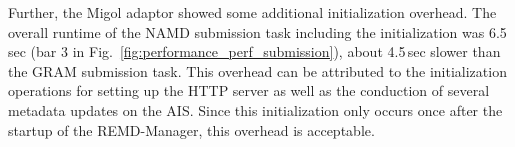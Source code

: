 \documentclass{rspublic}
\begin{document}
Further, the Migol adaptor showed some additional initialization
overhead. The overall runtime of the NAMD submission task including
the initialization was 6.5\,sec (bar 3 in
Fig.~\ref{fig:performance_perf_submission}), about 4.5\,sec slower
than the GRAM submission task. This overhead can be attributed to the
initialization operations for setting up the HTTP server as well as
the conduction of several metadata updates on the AIS. Since this
initialization only occurs once after the startup of the REMD-Manager,
this overhead is acceptable.
                                                                                                                    

\end{document}
